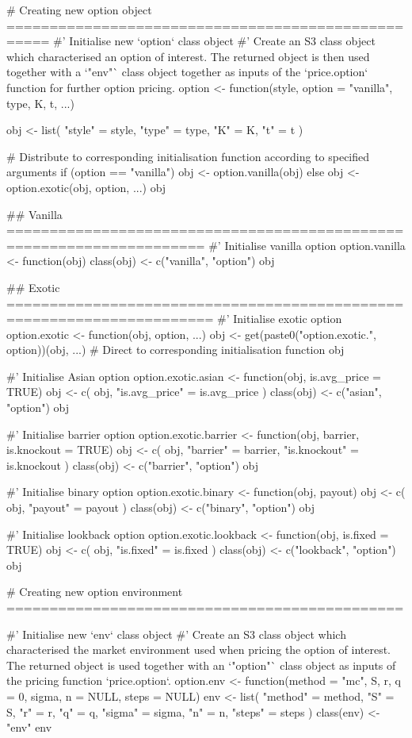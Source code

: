 \begin{Rminted}
# Creating new option object ===================================================
#' Initialise new `option` class object
#' Create an S3 class object which characterised an option of interest. The returned object is then used together with a `"env"` class object together as inputs of the `price.option` function for further option pricing.
option <- function(style, option = "vanilla", type, K, t, ...) {

    obj <- list(
        "style" = style,
        "type" = type,
        "K" = K,
        "t" = t
    )

    # Distribute to corresponding initialisation function according to specified arguments
    if (option == "vanilla") {
        obj <- option.vanilla(obj)
    } else {
        obj <- option.exotic(obj, option, ...)
    }
    obj
}

## Vanilla =====================================================================
#' Initialise vanilla option
option.vanilla <- function(obj) {
    class(obj) <- c("vanilla", "option")
    obj
}

## Exotic ======================================================================
#' Initialise exotic option
option.exotic <- function(obj, option, ...) {
    obj <- get(paste0("option.exotic.", option))(obj, ...) # Direct to corresponding initialisation function
    obj
}

#' Initialise Asian option
option.exotic.asian <- function(obj, is.avg_price = TRUE) {
    obj <- c(
        obj,
        "is.avg_price" = is.avg_price
    )
    class(obj) <- c("asian", "option")
    obj
}

#' Initialise barrier option
option.exotic.barrier <- function(obj, barrier, is.knockout = TRUE) {
    obj <- c(
        obj,
        "barrier" = barrier,
        "is.knockout" = is.knockout
    )
    class(obj) <- c("barrier", "option")
    obj
}

#' Initialise binary option
option.exotic.binary <- function(obj, payout) {
    obj <- c(
        obj,
        "payout" = payout
    )
    class(obj) <- c("binary", "option")
    obj
}

#' Initialise lookback option
option.exotic.lookback <- function(obj, is.fixed = TRUE) {
    obj <- c(
        obj,
        "is.fixed" = is.fixed
    )
    class(obj) <- c("lookback", "option")
    obj
}

# Creating new option environment ==============================================

#' Initialise new `env` class object
#' Create an S3 class object which characterised the market environment used when pricing the option of interest. The returned object is used together with an `"option"` class object as inputs of the pricing function `price.option`.
option.env <- function(method = "mc", S, r, q = 0, sigma, n = NULL, steps = NULL) {
    env <- list(
        "method" = method,
        "S" = S,
        "r" = r,
        "q" = q,
        "sigma" = sigma,
        "n" = n,
        "steps" = steps
    )
    class(env) <- "env"
    env
}
\end{Rminted}

